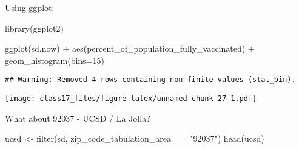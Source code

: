 \documentclass[
]{article}
\newenvironment{Shaded}{\begin{snugshade}}{\end{snugshade}}
\newcommand{\AttributeTok}[1]{\textcolor[rgb]{0.77,0.63,0.00}{#1}}
\newcommand{\DecValTok}[1]{\textcolor[rgb]{0.00,0.00,0.81}{#1}}
\newcommand{\FunctionTok}[1]{\textcolor[rgb]{0.00,0.00,0.00}{#1}}
\newcommand{\NormalTok}[1]{#1}
\newcommand{\OtherTok}[1]{\textcolor[rgb]{0.56,0.35,0.01}{#1}}
\newcommand{\SpecialCharTok}[1]{\textcolor[rgb]{0.00,0.00,0.00}{#1}}
\newcommand{\StringTok}[1]{\textcolor[rgb]{0.31,0.60,0.02}{#1}}
\begin{document}
Using ggplot:

\begin{Shaded}
\begin{Highlighting}[]
\FunctionTok{library}\NormalTok{(ggplot2)}

\FunctionTok{ggplot}\NormalTok{(sd.now) }\SpecialCharTok{+} 
  \FunctionTok{aes}\NormalTok{(percent\_of\_population\_fully\_vaccinated) }\SpecialCharTok{+} 
  \FunctionTok{geom\_histogram}\NormalTok{(}\AttributeTok{bins=}\DecValTok{15}\NormalTok{)}
\end{Highlighting}
\end{Shaded}

\begin{verbatim}
## Warning: Removed 4 rows containing non-finite values (stat_bin).
\end{verbatim}

\texttt{[image: class17\_files/figure-latex/unnamed-chunk-27-1.pdf]}

What about 92037 - UCSD / La Jolla?

\begin{Shaded}
\begin{Highlighting}[]
\NormalTok{ucsd }\OtherTok{\textless{}{-}} \FunctionTok{filter}\NormalTok{(sd, zip\_code\_tabulation\_area }\SpecialCharTok{==} \StringTok{"92037"}\NormalTok{)}
\FunctionTok{head}\NormalTok{(ucsd)}
\end{Highlighting}
\end{Shaded}
\end{document}
